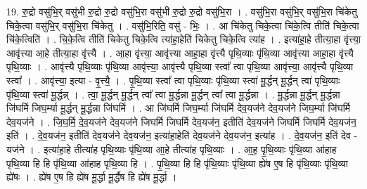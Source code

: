 \documentclass[17pt]{extarticle}
\begin{document}
19. रु॒द्रो वसु॑भि॒र् वसु॑भी रु॒द्रो रु॒द्रो वसु॑भि॒रा वसु॑भी रु॒द्रो रु॒द्रो वसु॑भि॒रा । . वसु॑भि॒रा वसु॑भि॒र् वसु॑भि॒रा चि॑केतु चिके॒त्वा वसु॑भि॒र् वसु॑भि॒रा चि॑केतु । . वसु॑भि॒रिति॒ वसु॑ - भिः॒ । . आ चि॑केतु चिके॒त्वा चि॑के॒त्वि तीति॑ चिके॒त्वा चि॑के॒त्विति॑ । . चि॒के॒त्वि तीति॑ चिकेतु चिके॒त्वि त्या॑हा॒हेति॑ चिकेतु चिके॒त्वि त्या॑ह । . इत्या॑हा॒हे तीत्या॒हा वृ॑त्त्या॒ आवृ॑त्त्या आ॒हे तीत्या॒हा वृ॑त्त्यै । . आ॒हा वृ॑त्त्या॒ आवृ॑त्त्या आहा॒हा वृ॑त्त्यै पृथि॒व्याः पृ॑थि॒व्या आवृ॑त्त्या आहा॒हा वृ॑त्त्यै पृथि॒व्याः । . आवृ॑त्त्यै पृथि॒व्याः पृ॑थि॒व्या आवृ॑त्त्या॒ आवृ॑त्त्यै पृथि॒व्या स्त्वा᳚ त्वा पृथि॒व्या आवृ॑त्त्या॒ आवृ॑त्त्यै पृथि॒व्या स्त्वा᳚ । . आवृ॑त्त्या॒ इत्या - वृ॒त्त्यै॒ । . पृ॒थि॒व्या स्त्वा᳚ त्वा पृथि॒व्याः पृ॑थि॒व्या स्त्वा॑ मू॒र्द्धन् मू॒र्द्धन् त्वा॑ पृथि॒व्याः पृ॑थि॒व्या स्त्वा॑ मू॒र्द्धन्न् । . त्वा॒ मू॒र्द्धन् मू॒र्द्धन् त्वा᳚ त्वा मू॒र्द्धन्ना मू॒र्द्धन् त्वा᳚ त्वा मू॒र्द्धन्ना । . मू॒र्द्धन्ना मू॒र्द्धन् मू॒र्द्धन्ना जि॑घर्मि जिघ॒र्म्या मू॒र्द्धन् मू॒र्द्धन्ना जि॑घर्मि । . आ जि॑घर्मि जिघ॒र्म्या जि॑घर्मि देव॒यज॑ने देव॒यज॑ने जिघ॒र्म्या जि॑घर्मि देव॒यज॑ने । . जि॒घ॒र्मि॒ दे॒व॒यज॑ने देव॒यज॑ने जिघर्मि जिघर्मि देव॒यज॑न॒ इतीति॑ देव॒यज॑ने जिघर्मि जिघर्मि देव॒यज॑न॒ इति॑ । . दे॒व॒यज॑न॒ इतीति॑ देव॒यज॑ने देव॒यज॑न॒ इत्या॑हा॒हेति॑ देव॒यज॑ने देव॒यज॑न॒ इत्या॑ह । . दे॒व॒यज॑न॒ इति॑ देव - यज॑ने । . इत्या॑हा॒हे तीत्या॑ह पृथि॒व्याः पृ॑थि॒व्या आ॒हे तीत्या॑ह पृथि॒व्याः । . आ॒ह॒ पृ॒थि॒व्याः पृ॑थि॒व्या आ॑हाह पृथि॒व्या हि हि पृ॑थि॒व्या आ॑हाह पृथि॒व्या हि । . पृ॒थि॒व्या हि हि पृ॑थि॒व्याः पृ॑थि॒व्या ह्ये॑ष ए॒ष हि पृ॑थि॒व्याः पृ॑थि॒व्या ह्ये॑षः । . ह्ये॑ष ए॒ष हि ह्ये॑ष मू॒र्द्धा मू॒र्द्धैष हि ह्ये॑ष मू॒र्द्धा । \newline
\end{document}
